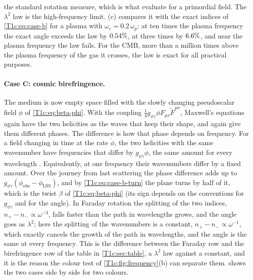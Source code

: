 the standard rotation measure, which is what \cite{KosowskyLoeb1996} evaluate for a primordial field. The $\lambda^2$ law is the high-frequency limit. (c) compares it with the exact indices of \eqref{T1c:eq:case-b} for a plasma with $\omega_c=0.2\,\omega_p$: at ten times the plasma frequency the exact angle exceeds the law by $0.54\%$, at three times by $6.6\%$, and near the plasma frequency the law fails. For the CMB, more than a million times above the plasma frequency of the gas it crosses, the law is exact for all practical purposes.

\paragraph{Case C: cosmic birefringence.} The medium is now empty space filled with the slowly changing pseudoscalar field $\phi$ of \eqref{T1c:eq:beta-phi}. With the coupling $\frac14g_{\phi\gamma}\phi F_{\mu\nu}\tilde F^{\mu\nu}$, Maxwell's equations again have the two helicities as the waves that keep their shape, and again give them different phases. The difference is how that phase depends on frequency. For a field changing in time at the rate $\dot\phi$, the two helicities with the same wavenumber have frequencies that differ by $g_{\phi\gamma}\dot\phi$, the same amount for every wavelength \cite{CarrollFieldJackiw1990,Carroll1998}. Equivalently, at one frequency their wavenumbers differ by a fixed amount. Over the journey from last scattering the phase difference adds up to $g_{\phi\gamma}(\phi_{\mathrm{obs}}-\phi_{\mathrm{LSS}})$, and by \eqref{T1c:eq:case-b-turn} the plane turns by half of it, which is the twist $\beta$ of \eqref{T1c:eq:beta-phi} (its sign depends on the conventions for $g_{\phi\gamma}$ and for the angle). In Faraday rotation the splitting of the two indices, $n_+-n_-\propto\omega^{-3}$, falls faster than the path in wavelengths grows, and the angle goes as $\lambda^2$; here the splitting of the wavenumbers is a constant, $n_+-n_-\propto\omega^{-1}$, which exactly cancels the growth of the path in wavelengths, and the angle is the same at every frequency. This is the difference between the Faraday row and the birefringence row of the table in \cref{T1c:sec:table}, a $\lambda^2$ law against a constant, and it is the reason the colour test of \cref{T1c:fig:frequency}(b) can separate them.  shows the two cases side by side for two colours.

